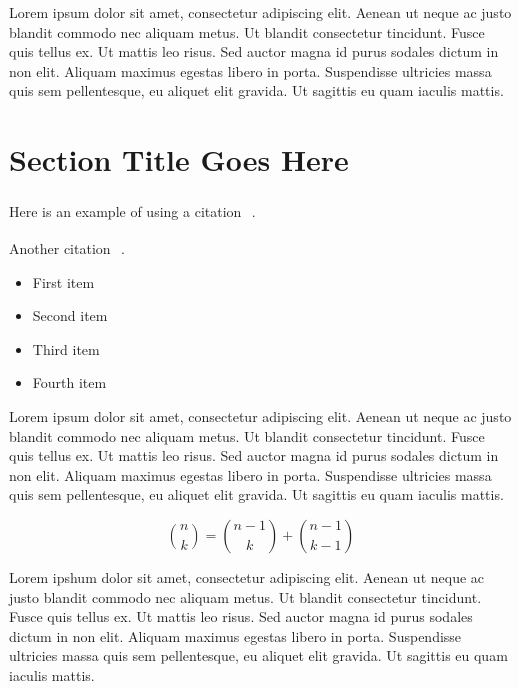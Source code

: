 \documentclass{csmagazine}
\begin{document}
\begin{flushleft}
Lorem ipsum dolor sit amet, consectetur adipiscing elit. Aenean ut neque ac justo blandit commodo nec aliquam metus. Ut blandit consectetur tincidunt. Fusce quis tellus ex. Ut mattis leo risus. Sed auctor magna id purus sodales dictum in non elit. Aliquam maximus egestas libero in porta. Suspendisse ultricies massa quis sem pellentesque, eu aliquet elit gravida. Ut sagittis eu quam iaculis mattis.

\section*{Section Title Goes Here}

Here is an example of using a citation \textsuperscript{~\cite{Lamport1994a}}.

Another citation \textsuperscript{~\cite{Goossens1997}}.


\begin{itemize}
	\item First item
	\item Second item
	\item Third item
	\item Fourth item
\end{itemize}

Lorem ipsum dolor sit amet, consectetur adipiscing elit. Aenean ut neque ac justo blandit commodo nec aliquam metus. Ut blandit consectetur tincidunt. Fusce quis tellus ex. Ut mattis leo risus. Sed auctor magna id purus sodales dictum in non elit. Aliquam maximus egestas libero in porta. Suspendisse ultricies massa quis sem pellentesque, eu aliquet elit gravida. Ut sagittis eu quam iaculis mattis.



\[\binom{n}{k} =\binom{n-1}{k} + \binom{n-1}{k-1}\]

Lorem ipshum dolor sit amet, consectetur adipiscing elit. Aenean ut neque ac justo blandit commodo nec aliquam metus. Ut blandit consectetur tincidunt. Fusce quis tellus ex. Ut mattis leo risus. Sed auctor magna id purus sodales dictum in non elit. Aliquam maximus egestas libero in porta. Suspendisse ultricies massa quis sem pellentesque, eu aliquet elit gravida. Ut sagittis eu quam iaculis mattis.


\end{flushleft}

\end{document}
